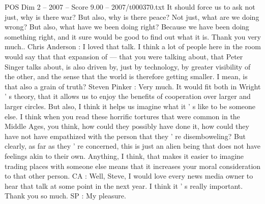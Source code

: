 \begin{textsample}{POS Dim 2 – 2007 – Score 9.00 – 2007/t000370.txt}
It should force us to ask not just, why is there war?
But also, why is there peace?
Not just, what are we doing wrong?
But also, what have we been doing right?
Because we have been doing something right, and it sure would be good to find out what it is.
Thank you very much..
Chris Anderson : I loved that talk.
I think a lot of people here in the room would say that that expansion of — that you were talking about, that Peter Singer talks about, is also driven by, just by technology, by greater visibility of the other, and the sense that the world is therefore getting smaller.
I mean, is that also a grain of truth?
Steven Pinker : Very much.
It would fit both in Wright ' s theory, that it allows us to enjoy the benefits of cooperation over larger and larger circles.
But also, I think it helps us imagine what it ' s like to be someone else.
I think when you read these horrific tortures that were common in the Middle Ages, you think, how could they possibly have done it, how could they have not have empathized with the person that they ' re disemboweling?
But clearly, as far as they ' re concerned, this is just an alien being that does not have feelings akin to their own.
Anything, I think, that makes it easier to imagine trading places with someone else means that it increases your moral consideration to that other person.
CA : Well, Steve, I would love every news media owner to hear that talk at some point in the next year.
I think it ' s really important.
Thank you so much.
SP : My pleasure.

\end{textsample}
